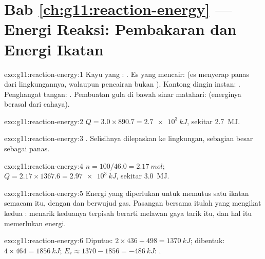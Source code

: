 \section*{Bab \ref{ch:g11:reaction-energy} --- Energi Reaksi: Pembakaran dan Energi Ikatan}

\begin{solution}{exo:g11:reaction-energy:1}
Kayu yang : . Es yang mencair:  (es menyerap
panas dari lingkungannya, walaupun pencairan bukan ).
Kantong dingin instan: . Penghangat tangan: . Pembuatan
gula di bawah sinar matahari:  (energinya berasal dari cahaya).
\end{solution}

\begin{solution}{exo:g11:reaction-energy:2}
$Q = 3.0 \times 890.7 = \qty{2.7e3}{kJ}$, sekitar \qty{2.7}{MJ}.
\end{solution}

\begin{solution}{exo:g11:reaction-energy:3}
. Selisihnya dilepaskan ke lingkungan, sebagian besar sebagai
panas.
\end{solution}

\begin{solution}{exo:g11:reaction-energy:4}
$n = 100 / 46.0 = \qty{2.17}{mol}$; $Q = 2.17 \times 1367.6 =
\qty{2.97e3}{kJ}$, sekitar \qty{3.0}{MJ}.
\end{solution}

\begin{solution}{exo:g11:reaction-energy:5}
Energi yang diperlukan untuk memutus satu  ikatan semacam itu, dengan
 dan  berwujud gas. Pasangan  bersama itulah yang
mengikat kedua : menarik keduanya terpisah berarti melawan gaya
tarik itu, dan hal itu memerlukan energi.
\end{solution}

\begin{solution}{exo:g11:reaction-energy:6}
Diputus: $2 \times 436 + 498 = \qty{1370}{kJ}$; dibentuk:
$4 \times 464 = \qty{1856}{kJ}$; $E_r \approx 1370 - 1856 =
\qty{-486}{kJ}$: .
\end{solution}

